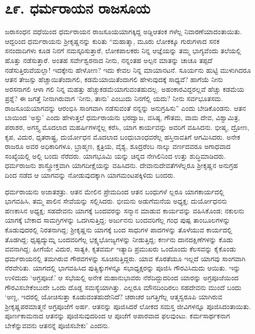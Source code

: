 
\chapter{೭೯. ಧರ್ಮರಾಯನ ರಾಜಸೂಯ}

ಜರಾಸಂಧನ ವಧೆಯಿಂದ ಧರ್ಮರಾಯನ ರಾಜಸೂಯಯಾಗಕ್ಕಿದ್ದ ಅಡ್ಡಿಆತಂಕ ಗಳೆಲ್ಲ ನಿವಾರಣೆಯಾದಂತಾಯಿತು. ಆದ್ದರಿಂದ ಧರ್ಮರಾಯನು ಶ್ರೀಕೃಷ್ಣನನ್ನು ಕುರಿತು “ಮಹಾತ್ಮಾ, ಮೂರು ಲೋಕಕ್ಕೂ ಗುರುಗಳಾದ ಸನಕ ಸನಂದಾದಿಗಳು ಕೂಡ ನಿನಗೆ ನಮಸ್ಕರಿಸುತ್ತಾರೆ, ಲೋಕಪಾಲಕರು ನಿನ್ನ ಆಜ್ಞೆಯನ್ನು ತಮ್ಮ ಭಾಗ್ಯವೆಂದು ತಲೆಯಲ್ಲಿ ಹೊತ್ತು ನಡೆಸುತ್ತಾರೆ. ಅಂತಹ ಸರ್ವೇಶ್ವರನಾದ ನೀನು, ನನ್ನಂತಹ ಅಲ್ಪನ ಮಾತನ್ನು ಚಾಚೂ ತಪ್ಪದೆ ನಡೆಸುತ್ತಿರುವೆಯಲ್ಲಾ! ಇದಕ್ಕೇನು ಹೇಳೋಣ? ಇದು ಕೇವಲ ನಿನ್ನ ಮಾಯಾನಟನೆ. ಸೂರ್ಯನು ಹುಟ್ಟಿ ಮುಳುಗಿದರೂ ಆತನ ತೇಜಸ್ಸು ಹೆಚ್ಚಾಯಿತೆಂದಾಗಲಿ, ಕಡಮೆಯಾಯಿತೆಂದಾಗಲಿ ಹೇಳುವುದಕ್ಕೆ ಸಾಧ್ಯವೆ? ಹಾಗೆಯೆ ನೀನು ಅರಸನಾಗಲಿ ಆಳಾ ಗಲಿ ನಿನ್ನ ಮಹತ್ತು ಹೆಚ್ಚುಕಡಮೆಯಾಗುವಂತಹುದಲ್ಲ. ಅಹಂಕಾರವಿದ್ದರಲ್ಲವೆ ಹೆಚ್ಚು ಕಡಮೆಯ ಪ್ರಶ್ನೆ? ಈ ಜಗತ್ತೆ ನೀನಾಗಿರುವಾಗ ‘ನೀನು, ತಾನು’ ಎಂಬುದು ನಿನಗೆಲ್ಲಿ ಯದು? ನೀನು ಸರ್ವಭೂತಸಮ. ರಾಜಸೂಯಯಾಗವನ್ನು ಆರಂಭಿಸಿ ಸಾಂಗವಾಗಿ ನಡೆಸುವಂತೆ ನನ್ನನ್ನು ಅನುಗ್ರಹಿಸು” ಎಂದು ಬೇಡಿಕೊಂಡನು. ಆತನ ಬಾಯಿಂದ ‘ಅಸ್ತು’ ಎಂದು ಹೇಳುತ್ತಲೆ ಧರ್ಮರಾಯನು ಭರದ್ವಾಜ, ವಸಿಷ್ಠ, ಗೌತಮ, ವಾಮ ದೇವ, ವಿಶ್ವಾಮಿತ್ರ, ಪರಾಶರ, ಅಗಸ್ತ್ಯ ಮೊದಲಾದ ಮಹರ್ಷಿಗಳನ್ನೆಲ್ಲ ಕರೆಸಿ, ಯಾಗ ಕಾರ್ಯವನ್ನು ಅವರಿಗೆ ವಹಿಸಿದನು. ಭೀಷ್ಮ, ದ್ರೋಣ, ಕೃಪ, ವಿದುರ, ಧೃತರಾಷ್ಟ್ರ, ದುರ್ಯೋಧನ ಮೊದಲಾದ ಬಂಧುಬಾಂಧವರೆಲ್ಲ ಹಸ್ತಿನಾವತಿಗೆ ಆಗಮಿಸಿದರು. ಅನೇಕ ರಾಜರೂ ಅವರ ಅಧಿಕಾರಿಗಳೂ, ಬ್ರಾಹ್ಮಣ, ಕ್ಷತ್ರಿಯ, ವೈಶ್ಯ, ಶೂದ್ರರೆಂಬ ನಾಲ್ಕು ವರ್ಣದವರೂ ಅಗಾಧವಾದ ಸಂಖ್ಯೆಯಲ್ಲಿ ಅಲ್ಲಿ ಬಂದು ನೆರೆದರು. ಯಾಗಭೂಮಿ ಯನ್ನು ಚಿನ್ನದ ನೇಗಿಲಿನಿಂದ ಉತ್ತು ಶುದ್ಧಿಮಾಡಿದರು. ಧರ್ಮರಾಜನು ಶಾಸ್ತ್ರೋಕ್ತವಾಗಿ ಯಾಗದೀಕ್ಷೆಯನ್ನು ವಹಿಸಿದನು. ದೇವಾನುದೇವತೆಗಳೆಲ್ಲರೂ ಶ್ರೀಕೃಷ್ಣನ ಅನುಗ್ರಹ ದಿಂದ ನಡೆದ ಆ ಯಾಗವನ್ನು ನೋಡುವುದಕ್ಕಾಗಿ ಯಾಗಮಂಟಪಕ್ಕಿಳಿದು ಬಂದರು.

ಧರ್ಮರಾಯನು ಅಜಾತಶತ್ರು. ಆತನ ಮೇಲಿನ ಪ್ರೇಮದಿಂದ ಆತನ ಬಂಧುಗಳೆ ಲ್ಲರೂ ಯಾಗಕಾರ್ಯದಲ್ಲಿ ಭಾಗವಹಿಸಿ, ತಮ್ಮ ಪಾಲಿನ ಸೇವೆಯನ್ನು ಸಲ್ಲಿಸಿದರು. ಭೀಮನು ಅಡುಗೆಮನೆಯ ಅಧ್ಯಕ್ಷ; ದುರ್ಯೋಧನನು ಹಣಕಾಸಿನ ಅಧ್ಯಕ್ಷ; ಸಹದೇವನು ಯಾಗಕ್ಕೆ ಬಂದವರನ್ನು ಸನ್ಮಾನ ಮಾಡುವ ಕಾರ್ಯವನ್ನು ವಹಿಸಿಕೊಂಡ; ನಕುಲನು ಯಾಗಕ್ಕೆ ಬೇಕಾದ ಸಾಮಗ್ರಿಗಳನ್ನು ಒದಗಿಸುತ್ತಿದ್ದ; ಅರ್ಜುನನು ಬಂದವರಿಗೆಲ್ಲ ಗಂಧ ಪುಷ್ಪ ತಾಂಬೂಲಗಳನ್ನು ಕೊಡುವುದರಲ್ಲಿ ನಿರತನಾಗಿದ್ದ; ಶ್ರೀಕೃಷ್ಣನು ಯಾಗಕ್ಕೆ ಬಂದ ಸಾಧುಗಳ ಪಾದಗಳನ್ನು ತೊಳೆಯುವ ಕಾರ್ಯದಲ್ಲಿ ತೊಡಗಿದ್ದ; ಧೃಷ್ಟದ್ಯುಮ್ನ ಬಂದವರಿಗೆಲ್ಲ ಭಕ್ಷ್ಯಭೋಜ್ಯಗಳನ್ನು ನೀಡುತ್ತಿದ್ದ; ಕರ್ಣನು ದಾನದಕ್ಷಿಣೆಗಳನ್ನು ಕೊಡು ವವನಾಗಿದ್ದ; ಹೀಗೆಯೇ ವಿದುರ, ಸಾತ್ಯಕಿ, ಕೃತವರ್ಮ ಇತ್ಯಾದಿ ಪ್ರಮುಖರು ಒಂದೊಂದು ಕೆಲಸವನ್ನು ಕೈಕೊಂಡು ಧರ್ಮರಾಯನಲ್ಲಿ ತಮಗಿರುವ ಗೌರವಗಳನ್ನು ಸೂಚಿಸುತ್ತಿದ್ದರು. ಯಾವ ಕೊರತೆಯೂ ಇಲ್ಲದೆ ಯಾಗವು ಸಾಂಗವಾಗಿ ನೆರವೇರಿತು. ಯಾಗದಲ್ಲಿ ಭಾಗವಹಿಸಿದ ಪುತ್ವಿಕ್ಕುಗಳನ್ನೂ ಸಭಾಧ್ಯಕ್ಷರನ್ನು ಪೂಜಿಸಿ ಗೌರವಿಸಿದುದು ಆಯಿತು. ಇನ್ನು ಉಳಿದುದು ‘ಅಗ್ರಪೂಜೆ.’ ಆ ಸಭೆಯಲ್ಲಿ ಅನೇಕ ಮಹಾನುಭಾವರು ನೆರೆದಿದ್ದುದರಿಂದ ಯಾರನ್ನು ಅಗ್ರಪೂಜೆಯಿಂದ ಗೌರವಿಸಬೇಕೆಂಬುದೇ ಒಂದು ದೊಡ್ಡ ಸಮಸ್ಯೆಯಾಗಿತ್ತು. ಎಲ್ಲರೂ ಮೌನದಿಂದಿರಲು ಸಹದೇವನು ಮುಂದೆ ಬಂದು ‘ಅಣ್ಣ, ಇದರಲ್ಲಿ ಯೋಚಿಸುತ್ತಾ ಕೂಡುವಂತಹುದೇನಿದೆ? ಚರಾಚರ ಜಗತ್ತಿಗೆಲ್ಲ ಆತ್ಮಸ್ವರೂಪಿ ಯಾಗಿರುವ ಶ್ರೀಕೃಷ್ಣಪರಮಾತ್ಮನೆ ಅಗ್ರಪೂಜೆಗೆ ಅರ್ಹ. ಆತನನ್ನು ಪೂಜಿಸಿದರೆ ಲೋಕದ ಸಮಸ್ತ ಜೀವಿಗಳನ್ನೂ ಪೂಜಿಸಿದಂತಾಯಿತು. ಪೂರ್ಣಕಾಮನಾದ ಆತನನ್ನು ಪೂಜಿಸುವುದರಿಂದ ಆ ಪೂಜೆಗೆ ಅಪಾರವಾದ ಫಲವುಂಟು. ಕರ್ಮಸಾರ್ಥಕನಾಗ ಬೇಕೆನ್ನುವವನು ಆತನನ್ನೆ ಪೂಜಿಸಬೇಕು’ ಎಂದನು.

